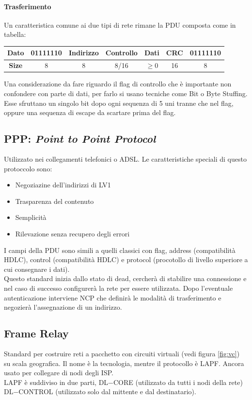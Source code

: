 \documentclass[12pt]{article}
\begin{document}
\paragraph{Trasferimento}
Un caratteristica comune ai due tipi di rete rimane la PDU composta come in tabella:
\begin{center}
  \begin{tabular}{ |c||c|c|c|c|c|c| }
    \hline
    \textbf{Dato} & 01111110 & Indirizzo & Controllo & Dati & CRC & 01111110 \\
    \hline
    \textbf{Size} & 8 & 8 & 8/16 & $\geq 0$ & 16 & 8\\
    \hline
  \end{tabular}
\end{center}
Una considerazione da fare riguardo il flag di controllo che è importante non confondere con parte di dati, per farlo si usano tecniche come Bit o Byte Stuffing. Esse sfruttano un singolo bit dopo ogni sequenza di 5 uni tranne che nel flag, oppure una sequenza di escape da scartare prima del flag.

\subsection{PPP: \textit{Point to Point Protocol}}
Utilizzato nei collegamenti telefonici o ADSL. Le caratteristiche speciali di questo protoccolo sono:
\begin{itemize}
  \item Negoziazine dell'indirizzi di LV1
  \item Trasparenza del contenuto
  \item Semplicità
  \item Rilevazione senza recupero degli errori
\end{itemize}
I campi della PDU sono simili a quelli classici con flag, address (compatibilità HDLC), control (compatibilità HDLC) e protocol (procotollo di livello superiore a cui consegnare i dati).\\
Questo standard inizia dallo stato di dead, cercherà di stabilire una connessione e nel caso di successo configurerà la rete per essere utilizzata. Dopo l'eventuale autenticazione interviene NCP che definirà le modalità di trasferimento e negozierà l'assegnazione di un indirizzo.

\subsection{Frame Relay}
Standard per costruire reti a pacchetto con circuiti virtuali (vedi figura \ref{fig:vc}) su scala geografica. Il nome è la tecnologia, mentre il protocollo è LAPF. Ancora usato per collegare di nodi degli ISP.\\
LAPF è suddiviso in due parti, DL$-$CORE (utilizzato da tutti i nodi della rete) DL$-$CONTROL (utilizzato solo dal mittente e dal destinatario).
\end{document}

